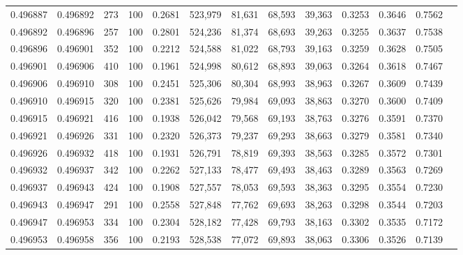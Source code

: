 \begin{tabular}{rrrrrrrrrrrrr}
0.496887 & 0.496892 &   273 & 100 &                                     0.2681 & 523,979 &  81,631 &  68,593 &  39,363 & 0.3253 & 0.3646 & 0.7562 \\
0.496892 & 0.496896 &   257 & 100 &                                     0.2801 & 524,236 &  81,374 &  68,693 &  39,263 & 0.3255 & 0.3637 & 0.7538 \\
0.496896 & 0.496901 &   352 & 100 &                                     0.2212 & 524,588 &  81,022 &  68,793 &  39,163 & 0.3259 & 0.3628 & 0.7505 \\
0.496901 & 0.496906 &   410 & 100 &                                     0.1961 & 524,998 &  80,612 &  68,893 &  39,063 & 0.3264 & 0.3618 & 0.7467 \\
0.496906 & 0.496910 &   308 & 100 &                                     0.2451 & 525,306 &  80,304 &  68,993 &  38,963 & 0.3267 & 0.3609 & 0.7439 \\
0.496910 & 0.496915 &   320 & 100 &                                     0.2381 & 525,626 &  79,984 &  69,093 &  38,863 & 0.3270 & 0.3600 & 0.7409 \\
0.496915 & 0.496921 &   416 & 100 &                                     0.1938 & 526,042 &  79,568 &  69,193 &  38,763 & 0.3276 & 0.3591 & 0.7370 \\
0.496921 & 0.496926 &   331 & 100 &                                     0.2320 & 526,373 &  79,237 &  69,293 &  38,663 & 0.3279 & 0.3581 & 0.7340 \\
0.496926 & 0.496932 &   418 & 100 &                                     0.1931 & 526,791 &  78,819 &  69,393 &  38,563 & 0.3285 & 0.3572 & 0.7301 \\
0.496932 & 0.496937 &   342 & 100 &                                     0.2262 & 527,133 &  78,477 &  69,493 &  38,463 & 0.3289 & 0.3563 & 0.7269 \\
0.496937 & 0.496943 &   424 & 100 &                                     0.1908 & 527,557 &  78,053 &  69,593 &  38,363 & 0.3295 & 0.3554 & 0.7230 \\
0.496943 & 0.496947 &   291 & 100 &                                     0.2558 & 527,848 &  77,762 &  69,693 &  38,263 & 0.3298 & 0.3544 & 0.7203 \\
0.496947 & 0.496953 &   334 & 100 &                                     0.2304 & 528,182 &  77,428 &  69,793 &  38,163 & 0.3302 & 0.3535 & 0.7172 \\
0.496953 & 0.496958 &   356 & 100 &                                     0.2193 & 528,538 &  77,072 &  69,893 &  38,063 & 0.3306 & 0.3526 & 0.7139 \\

\end{tabular}
